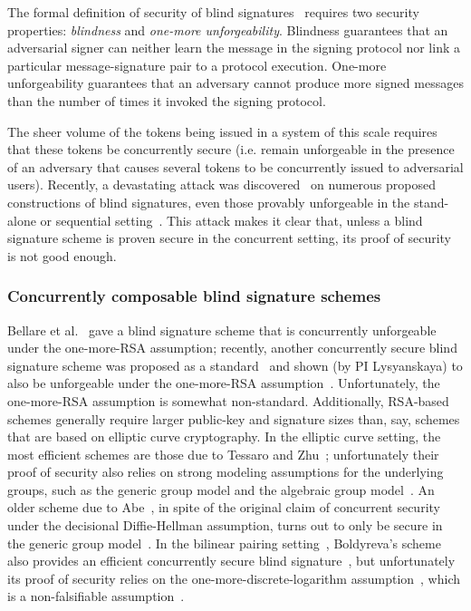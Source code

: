 The formal definition of security of blind signatures~\cite{JC:PoiSte00,C:JueLubOst97,RSA:AbdNamNev06,JC:SchUnr17} requires two security properties: \emph{blindness} and \emph{one-more unforgeability}. Blindness guarantees that an adversarial signer can neither learn the message in the signing protocol nor link a particular message-signature pair to a protocol execution.  One-more unforgeability guarantees that an adversary cannot produce more signed messages than the number of times it invoked the signing protocol.  

The sheer volume of the tokens being issued in a system of this scale requires that these tokens be concurrently secure (i.e. remain unforgeable in the presence of an adversary that causes several tokens to be concurrently issued to adversarial users). Recently, a devastating attack was discovered~\cite{EC:BLLOR21} on numerous proposed constructions of blind signatures, even those provably unforgeable in the stand-alone or sequential setting~\cite{C:Okamoto92,ICICS:Schnorr01,C:AbeOka00,C:Brands93,paquin2013u-prove,CCS:BalLys13,SP:STVWJG16,cryptoeprint:2017:682,JC:GJKR07}.  This attack makes it clear that, unless a blind signature scheme is proven secure in the concurrent setting, its proof of security is not good enough.

\subsubsection{Concurrently composable blind signature schemes}  
\label{rg1:blindsigs}

Bellare et al.~\cite{JC:BNPS03} gave a blind signature scheme that is concurrently unforgeable under the one-more-RSA assumption; recently, another concurrently secure blind signature scheme was proposed as a standard~\cite{ietf:djw21,ietf:djw22} and shown (by PI Lysyanskaya) to also be unforgeable under the one-more-RSA assumption~\cite{EPRINT:Lysyanskaya22}.  Unfortunately, the one-more-RSA assumption is somewhat non-standard.  Additionally, RSA-based schemes generally require larger public-key and signature sizes than, say, schemes that are based on elliptic curve cryptography.  In the elliptic curve setting, the most efficient schemes are those due to Tessaro and Zhu~\cite{EC:TesZhu22}; unfortunately their proof of security also relies on strong modeling assumptions for the underlying groups, such as the generic group model and the algebraic group model~\cite{C:FucKilLos18,EC:Shoup97}.  An older scheme due to Abe~\cite{EC:Abe01}, in spite of the original claim of concurrent security under the decisional Diffie-Hellman assumption, turns out to only be secure in the generic group model~\cite{kaloxu22}.  In the bilinear pairing setting~\cite{C:BonFra01}, Boldyreva's scheme also provides an efficient concurrently secure blind signature~\cite{PKC:Boldyreva03}, but unfortunately its proof of security relies on the one-more-discrete-logarithm assumption~\cite{C:BelPal02}, which is a non-falsifiable assumption~\cite{C:Naor03}.  

